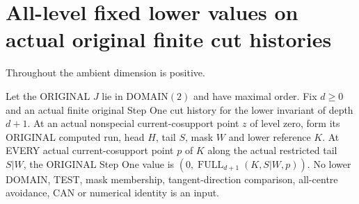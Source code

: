 \section{All-level fixed lower values on actual original finite cut histories}

Throughout the ambient dimension is positive.
\begin{theorem}
\label{hir:original-finite-cut-zero-fixed-lower-value}
\leanok
Let the ORIGINAL $J$ lie in DOMAIN$(2)$ and have maximal order. Fix
$d\ge0$ and an actual finite original Step One cut history for the lower
invariant of depth $d+1$. At an actual nonspecial current-cosupport point
$z$ of level zero, form its ORIGINAL computed run, head $H$, tail $S$,
mask $W$ and lower reference $K$. At EVERY actual current-cosupport point
$p$ of $K$ along the actual restricted tail $S|W$, the ORIGINAL Step One
value is $(0,\operatorname{FULL}_{d+1}(K,S|W,p))$. No lower DOMAIN, TEST,
mask membership, tangent-direction comparison, all-centre avoidance,
CAN or numerical identity is an input.
\end{theorem}
